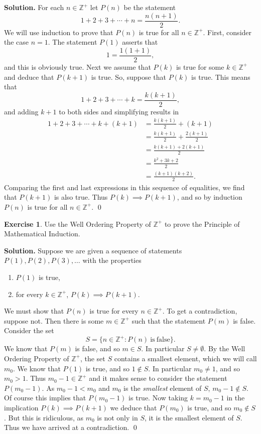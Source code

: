 \documentclass[10pt]{article}
\newcommand{\Z}{\mathbb Z}
\theoremstyle{definition}
\theoremstyle{remark}
\theoremstyle{definition}
\newtheorem{Exercise}[Thm]{Exercise}
\newenvironment{Solution}{\noindent\textbf{Solution.}}{\qed}
\begin{document}
\begin{Solution}
For each $n\in\Z^+$ let $P(n)$ be the statement 
\[
1+2+3+\cdots+ n = \frac{n(n+1)}{2}.
\]
We will use induction to prove that $P(n)$ is true for all $n\in\Z^+$.  
First, consider the case $n=1$.  The statement $P(1)$ asserts that 
\[
1=\frac{1(1+1)}{2},
\]
and this is obviously true.  Next we assume that $P(k)$ is true for some $k\in \Z^+$ and deduce that $P(k+1)$ is true.  So, 
suppose that $P(k)$ is true. This means that 
\[
1+2+3+\cdots+ k = \frac{k(k+1)}{2},
\]
and adding $k+1$ to both sides and simplifying results in
\begin{align*}
1+2+3+\cdots+ k  +(k+1) &= \frac{k(k+1)}{2} + (k+1) \\
&= \frac{k(k+1)}{2} + \frac{2(k+1)}{2} \\
&= \frac{k(k+1) + 2(k+1)}{2} \\
&= \frac{ k^2+3k+2}{2} \\
&= \frac{(k+1)(k+2)}{2}.
\end{align*}
Comparing the first and last expressions in this sequence of equalities, we find that $P(k+1)$ is also true.  
Thus $P(k)\implies P(k+1)$, and so by induction $P(n)$ is true for all $n\in \Z^+$.
\end{Solution}
 
 
 
\begin{Exercise}
Use the Well Ordering Property  of $\Z^+$ to prove the Principle of Mathematical Induction.
\end{Exercise}
 
\begin{Solution}
Suppose we are given a sequence of statements $P(1), P(2), P(3), \ldots$ with the properties
\begin{enumerate}
\item $P(1)$ is true,
\item for every $k\in \Z^+$, $P(k)\implies P(k+1)$.
\end{enumerate}
We must show that $P(n)$ is true for every $n\in \Z^+$.  To get a contradiction, suppose not.  
Then there is some $m\in \Z^+$ such that the  statement $P(m)$ is false.  Consider the set
\[
S = \{ n\in \Z^+ : P(n) \mathrm{\ is\ false} \}.
\]
We know that $P(m)$ is false, and so $m\in S$.   In particular $S\not=\emptyset$.  By the Well Ordering Property of 
$\Z^+$,  the set $S$ contains a smallest element, which we will call $m_0$.  We know that $P(1)$ is true, and so 
$1\not\in S$. In particular $m_0\not=1$, and so $m_0>1$.  Thus $m_0-1\in \Z^+$ 
and  it makes sense to consider the statement $P(m_0-1)$.  
As $m_0-1 <m_0$ and $m_0$ is the \emph{smallest} element of $S$, $m_0-1\not\in S$.  
Of course this implies that $P(m_0-1)$ is true.  Now taking $k=m_0-1$ in the implication $P(k)\implies P(k+1)$  
we deduce that $P(m_0)$ is true, and so $m_0\not\in S$.  But this is ridiculous, as $m_0$ is not only in $S$, 
it is the smallest element of $S$.  Thus we have arrived at a contradiction.
\end{Solution}
 
 
\end{document}
